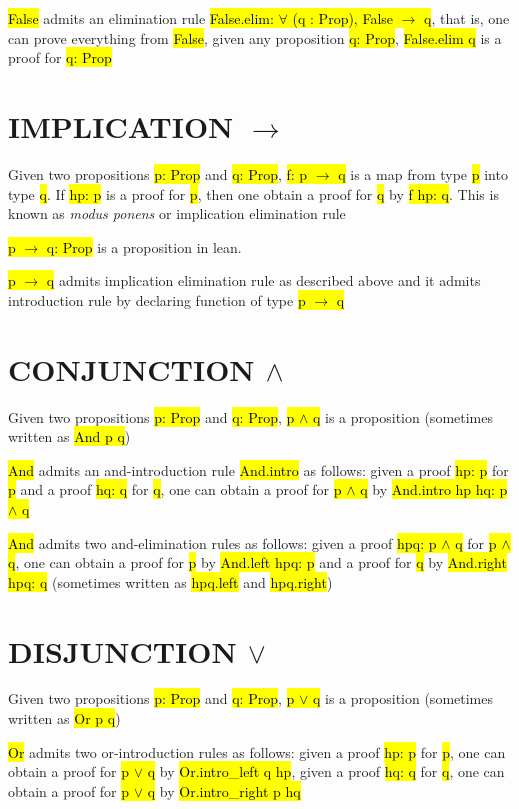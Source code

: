 \hl{False} admits an elimination rule \hl{False.elim: $\forall$ (q : Prop), False $\to$ q}, that is, one can prove everything from \hl{False}, given any proposition \hl{q: Prop}, \hl{False.elim q} is a proof for \hl{q: Prop}

\section{IMPLICATION $\to$}

Given two propositions \hl{p: Prop} and \hl{q: Prop}, \hl{f: p $\to$ q} is a map from type \hl{p} into type \hl{q}. If \hl{hp: p} is a proof for \hl{p}, then one obtain a proof for \hl{q} by \hl{f hp: q}. This is known as \textit{modus ponens} or implication elimination rule

\hl{p $\to$ q: Prop} is a proposition in lean.

\hl{p $\to$ q} admits implication elimination rule as described above and it admits introduction rule by declaring function of type \hl{p $\to$ q}

\section{CONJUNCTION $\land$}

Given two propositions \hl{p: Prop} and \hl{q: Prop}, \hl{p $\land$ q} is a proposition (sometimes written as \hl{And p q})

\hl{And} admits an and-introduction rule \hl{And.intro} as follows: given a proof \hl{hp: p} for \hl{p} and a proof \hl{hq: q} for \hl{q}, one can obtain a proof for \hl{p $\land$ q} by \hl{And.intro hp hq: p $\land$ q}

\hl{And} admits two and-elimination rules as follows: given a proof \hl{hpq: p $\land$ q} for \hl{p $\land$ q}, one can obtain a proof for \hl{p} by \hl{And.left hpq: p} and a proof for \hl{q} by \hl{And.right hpq: q} (sometimes written as \hl{hpq.left} and \hl{hpq.right})


\section{DISJUNCTION $\lor$}

Given two propositions \hl{p: Prop} and \hl{q: Prop}, \hl{p $\lor$ q} is a proposition (sometimes written as \hl{Or p q})

\hl{Or} admits two or-introduction rules as follows: given a proof \hl{hp: p} for \hl{p}, one can obtain a proof for \hl{p $\lor$ q} by \hl{Or.intro\_left q hp}, given a proof \hl{hq: q} for \hl{q}, one can obtain a proof for \hl{p $\lor$ q} by \hl{Or.intro\_right p hq}

